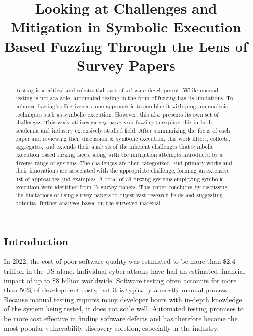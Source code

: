 \documentclass{article}
\title{Looking at Challenges and Mitigation in Symbolic Execution Based Fuzzing Through the Lens of Survey Papers}
\begin{document}


\maketitle
\begin{multicols}{2}
    \begin{abstract}
        Testing is a critical and substantial part of software development. While manual testing is not scalable, automated testing in the form of fuzzing has its limitations. To enhance fuzzing's effectiveness, one approach is to combine it with program analysis techniques such as symbolic execution. However, this also presents its own set of challenges. This work utilizes survey papers on fuzzing to explore this in both academia and industry extensively studied field. %
        After summarizing the focus of each paper and reviewing their discussion of symbolic execution, this work filters, collects, aggregates, and extends their analysis of the inherent challenges that symbolic execution based fuzzing faces, along with the mitigation attempts introduced by a diverse range of systems. The challenges are then categorized, and primary works and their innovations are associated with the appropriate challenge, forming an extensive list of approaches and examples. A total of 78 fuzzing systems employing symbolic execution were identified from 17 survey papers. %
        This paper concludes by discussing the limitations of using survey papers to digest vast research fields and suggesting potential further analyses based on the surveyed material.
    \end{abstract}

    \section{Introduction}
    In 2022, the cost of poor software quality was estimated to be more than \$2.4 trillion in the US alone.\cite{CostPoorSoftware} Individual cyber attacks have had an estimated financial impact of up to \$8 billion worldwide.\cite{Demystifying} Software testing often accounts for more than 50\% of development costs\cite{Orchestrated}, but it is typically a mostly manual process\cite{PreliminaryAssessment}. Because manual testing requires many developer hours with in-depth knowledge of the system being tested, it does not scale well. Automated testing promises to be more cost effective in finding software defects and has therefore become the most popular vulnerability discovery solution, especially in the industry.\cite{FuzzingASurvey}


\end{multicols}
\end{document}
